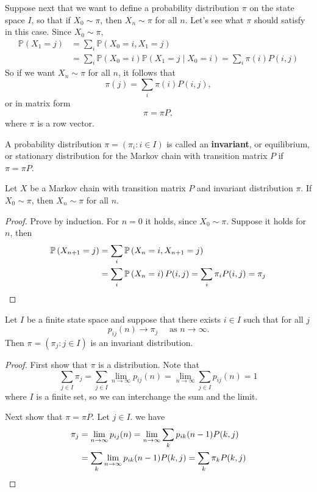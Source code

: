 \documentclass[a4paper]{article}
\begin{document}
Suppose next that we want to define a probability distribution $\pi$ on the state space $I$, so that if $X_0 \sim \pi$, then $X_n \sim \pi$ for all $n$. Let's see what $\pi$ should satisfy in this case. Since $X_0 \sim \pi$,
\begin{align*}
    \mathbb{P}\left(X_1=j\right)&=\sum_i \mathbb{P}\left(X_0=i, X_1=j\right)\\ 
    &=\sum_i \mathbb{P}\left(X_0=i\right) \mathbb{P}\left(X_1=j \mid X_0=i\right)=\sum_i \pi(i) P(i, j)
\end{align*}
So if we want $X_n \sim \pi$ for all $n$, it follows that
\[
\pi(j)=\sum_i \pi(i) P(i, j),
\]
or in matrix form
\[
\pi=\pi P,
\]
where $\pi$ is a row vector.

\begin{definition}
    A probability distribution $\pi=\left(\pi_i: i \in I\right)$ is called an \textbf{invariant}, or equilibrium, or stationary distribution for the Markov chain with transition matrix $P$ if $\pi=\pi P$.
\end{definition}

\begin{theorem}
    Let $X$ be a Markov chain with transition matrix $P$ and invariant distribution $\pi$. If $X_0 \sim \pi$, then $X_n \sim \pi$ for all $n$.
\end{theorem}
\begin{proof}
    Prove by induction. For $n=0$ it holds, since $X_0 \sim \pi$. Suppose it holds for $n$, then
    \begin{align*}
        \mathbb{P}\left(X_{n+1}=j\right)&=\sum_i \mathbb{P}\left(X_n=i, X_{n+1}=j\right)\\ 
        &=\sum_i \mathbb{P}\left(X_n=i\right) P(i, j)=\sum_i \pi_i P(i, j)=\pi_j\qedhere
    \end{align*}
\end{proof}

\begin{theorem}
    Let $I$ be a finite state space and suppose that there exists $i \in I$ such that for all $j$
    \[
    p_{i j}(n) \rightarrow \pi_j \quad \text { as } n \rightarrow \infty .
    \]
    Then $\pi=\left(\pi_j: j \in I\right)$ is an invariant distribution.
\end{theorem}

\begin{proof}
    First show that $\pi$ is a distribution. Note that
    \[
    \sum_{j \in I} \pi_j=\sum_{j \in I} \lim _{n \rightarrow \infty} p_{i j}(n)=\lim _{n \rightarrow \infty} \sum_{j \in I} p_{i j}(n)=1
    \]
    where $I$ is a finite set, so we can interchange the sum and the limit.

    Next show that $\pi=\pi P$. Let $j \in I$. we have
    \begin{align*}
        \pi_j&=\lim _{n \rightarrow \infty} p_{i j}(n)=\lim _{n \rightarrow \infty} \sum_k p_{i k}(n-1) P(k, j)\\ 
        &=\sum_k \lim _{n \rightarrow \infty} p_{i k}(n-1) P(k, j)=\sum_k \pi_k P(k, j)\qedhere
    \end{align*}
\end{proof}
\end{document}
